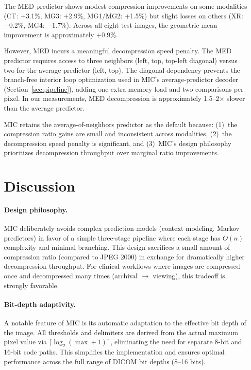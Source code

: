 \documentclass[11pt,twocolumn]{article}
\begin{document}
The MED predictor shows modest compression improvements on some modalities (CT: $+$3.1\%, MG3: $+$2.9\%, MG1/MG2: $+$1.5\%) but slight losses on others (XR: $-$0.2\%, MG4: $-$1.7\%).
Across all eight test images, the geometric mean improvement is approximately $+$0.9\%.

However, MED incurs a meaningful decompression speed penalty.
The MED predictor requires access to three neighbors (left, top, top-left diagonal) versus two for the average predictor (left, top).
The diagonal dependency prevents the branch-free interior loop optimization used in MIC's average-predictor decoder (Section~\ref{sec:pipeline}), adding one extra memory load and two comparisons per pixel.
In our measurements, MED decompression is approximately 1.5--2$\times$ slower than the average predictor.

MIC retains the average-of-neighbors predictor as the default because: (1)~the compression ratio gains are small and inconsistent across modalities, (2)~the decompression speed penalty is significant, and (3)~MIC's design philosophy prioritizes decompression throughput over marginal ratio improvements.

\section{Discussion}
\label{sec:discussion}

\paragraph{Design philosophy.}
MIC deliberately avoids complex prediction models (context modeling, Markov predictors) in favor of a simple three-stage pipeline where each stage has $O(n)$ complexity and minimal branching.
This design sacrifices a small amount of compression ratio (compared to JPEG 2000) in exchange for dramatically higher decompression throughput.
For clinical workflows where images are compressed once and decompressed many times (archival $\to$ viewing), this tradeoff is strongly favorable.

\paragraph{Bit-depth adaptivity.}
A notable feature of MIC is its automatic adaptation to the effective bit depth of the image.
All thresholds and delimiters are derived from the actual maximum pixel value via $\lceil\log_2(\max+1)\rceil$, eliminating the need for separate 8-bit and 16-bit code paths.
This simplifies the implementation and ensures optimal performance across the full range of DICOM bit depths (8--16 bits).
\end{document}
